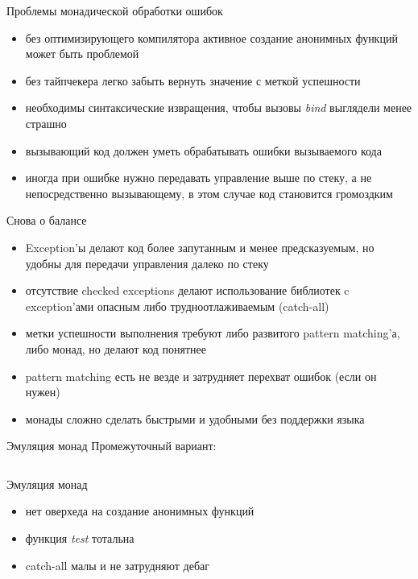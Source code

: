 \documentclass[10pt]{beamer}
\newcommand{\code}[4]{\inputminted[linenos, frame=none, firstline=#2, lastline=#3,
  framesep=10pt, bgcolor=lightgray]{#4}{#1}}
\begin{document}
\begin{frame}{Проблемы монадической обработки ошибок}
  \begin{itemize}
  \item без оптимизирующего компилятора активное создание анонимных функций может быть проблемой
  \item без тайпчекера легко забыть вернуть значение с меткой успешности
  \item необходимы синтаксические извращения, чтобы вызовы \emph{bind} выглядели менее страшно
  \item вызывающий код должен уметь обрабатывать ошибки вызываемого кода
  \item иногда при ошибке нужно передавать управление выше по стеку, а не непосредственно вызывающему, в этом случае код становится громоздким
  \end{itemize}
\end{frame}

\begin{frame}{Снова о балансе}
  \begin{itemize}
  \item Exception'ы делают код более запутанным и менее предсказуемым, но удобны для передачи управления далеко по стеку
  \item отсутствие checked exceptions делают использование библиотек c exception'ами опасным либо трудноотлаживаемым (catch-all)
  \item метки успешности выполнения требуют либо развитого pattern matching'а, либо монад, но делают код понятнее
  \item pattern matching есть не везде и затрудняет перехват ошибок (если он нужен)
  \item монады сложно сделать быстрыми и удобными без поддержки языка
  \end{itemize}
\end{frame}

\begin{frame}{Эмуляция монад}
  Промежуточный вариант:
  \code{code.py}{95}{110}{python}
\end{frame}

\begin{frame}{Эмуляция монад}
  \begin{itemize}
  \item нет оверхеда на создание анонимных функций
  \item функция \emph{test} тотальна
  \item catch-all малы и не затрудняют дебаг
  \end{itemize}
\end{frame}
\end{document}
